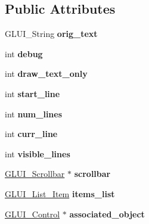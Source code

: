 \subsection*{Public Attributes}
\begin{DoxyCompactItemize}
\item 
\hypertarget{classGLUI__List_a95ca3818d11b598237439b8ebb414d34}{G\-L\-U\-I\-\_\-\-String {\bfseries orig\-\_\-text}}\label{classGLUI__List_a95ca3818d11b598237439b8ebb414d34}

\item 
\hypertarget{classGLUI__List_a542ba0f0fd1983f83329763d0a0acb62}{int {\bfseries debug}}\label{classGLUI__List_a542ba0f0fd1983f83329763d0a0acb62}

\item 
\hypertarget{classGLUI__List_a1179328db01f8d097e111fa5d2015a40}{int {\bfseries draw\-\_\-text\-\_\-only}}\label{classGLUI__List_a1179328db01f8d097e111fa5d2015a40}

\item 
\hypertarget{classGLUI__List_a475abba021f135544370a6ac04a9c8b1}{int {\bfseries start\-\_\-line}}\label{classGLUI__List_a475abba021f135544370a6ac04a9c8b1}

\item 
\hypertarget{classGLUI__List_a0747619e77ea5031f12ca09e75162edd}{int {\bfseries num\-\_\-lines}}\label{classGLUI__List_a0747619e77ea5031f12ca09e75162edd}

\item 
\hypertarget{classGLUI__List_ab679e49f81d8c137d2511eb42bed52f4}{int {\bfseries curr\-\_\-line}}\label{classGLUI__List_ab679e49f81d8c137d2511eb42bed52f4}

\item 
\hypertarget{classGLUI__List_ad400982efb9f4155bc7294f858f4de87}{int {\bfseries visible\-\_\-lines}}\label{classGLUI__List_ad400982efb9f4155bc7294f858f4de87}

\item 
\hypertarget{classGLUI__List_ac8fe09ec0191ac3ac6c71b1e6ddb8751}{\hyperlink{classGLUI__Scrollbar}{G\-L\-U\-I\-\_\-\-Scrollbar} $\ast$ {\bfseries scrollbar}}\label{classGLUI__List_ac8fe09ec0191ac3ac6c71b1e6ddb8751}

\item 
\hypertarget{classGLUI__List_afc3bcc6dbb8850c0639179706b0cd9be}{\hyperlink{classGLUI__List__Item}{G\-L\-U\-I\-\_\-\-List\-\_\-\-Item} {\bfseries items\-\_\-list}}\label{classGLUI__List_afc3bcc6dbb8850c0639179706b0cd9be}

\item 
\hypertarget{classGLUI__List_a1c3da23655fb3019ecf7836782c6a0c6}{\hyperlink{classGLUI__Control}{G\-L\-U\-I\-\_\-\-Control} $\ast$ {\bfseries associated\-\_\-object}}\label{classGLUI__List_a1c3da23655fb3019ecf7836782c6a0c6}


\end{DoxyCompactItemize}
